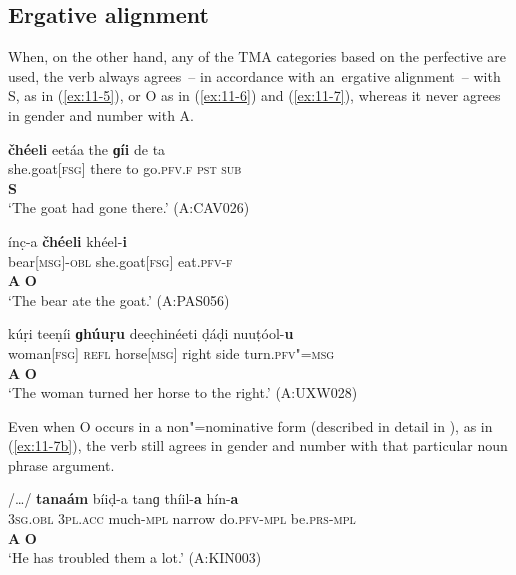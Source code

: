 \subsection{Ergative alignment}
\label{subsec:11-1-2}


When, on the other hand, any of the TMA categories based on the perfective are used, the verb always agrees~-- in accordance with an~ergative alignment~-- with S, as in (\ref{ex:11-5}), or O as in (\ref{ex:11-6}) and (\ref{ex:11-7}), whereas it never agrees in gender and number with A.

\begin{exe}
\ex
\label{ex:11-5}
\glll \textbf{čhéeli} eetáa the \textbf{ɡíi} de ta\\
she.goat[\textsc{fsg}] there to go.\textsc{pfv.}\textsc{f} \textsc{pst} \textsc{sub}\\
 \textbf{S} \\
\glt `The goat had gone there.' (A:CAV026)

\ex
\label{ex:11-6}
\glll ínc̣-a \textbf{čhéeli} khéel-\textbf{i}\\
bear[\textsc{msg}]-\textsc{obl} she.goat[\textsc{fsg}] eat.\textsc{pfv-}\textsc{f}\\
\textbf{A} \textbf{O} \\
\glt `The bear ate the goat.' (A:PAS056)

\ex
\label{ex:11-7}
\glll kúṛi teeṇíi \textbf{ɡhúuṛu} deec̣hinéeti ḍáḍi nuuṭóol-\textbf{u}\\
woman[\textsc{fsg}] \textsc{refl} horse[\textsc{msg}] right side turn.\textsc{pfv"=msg}\\
\textbf{A} {} \textbf{O} {} {}   \\
\glt `The woman turned her horse to the right.' (A:UXW028)
\end{exe}


Even when O occurs in a non"=nominative form (described in detail in ), as in (\ref{ex:11-7b}), the verb still agrees in gender and number with that particular noun phrase argument.

\begin{exe}
\ex
\label{ex:11-7b}
\glll [tíi] /{\ldots}/ \textbf{tanaám} bíiḍ-a tanɡ thíil-\textbf{a} hín-\textbf{a} \\
\textsc{3sg.obl} {} \textsc{3pl.acc} much-\textsc{mpl} narrow do.\textsc{pfv}-\textsc{mpl} be.\textsc{prs}-\textsc{mpl} \\
\textbf{A} {} \textbf{O} \\
\glt `He has troubled them a lot.' (A:KIN003)
\end{exe}


